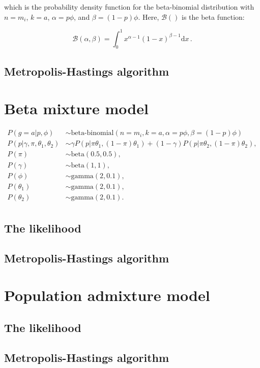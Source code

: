 \documentclass[11pt,english,letterpaper,oneside]{article}
\begin{document}
which is the probability density function for the beta-binomial distribution with $n = m_i$, $k = a$, $\alpha = p\phi$, and $\beta = (1 - p)\phi$. Here, $\mathcal{B}()$ is the beta function:

\begin{equation*}
\mathcal{B}(\alpha,\beta) = \int_0^1 x^{\alpha-1} (1 - x)^{\beta - 1} \text{d}x\, .
\end{equation*}

\subsection{Metropolis-Hastings algorithm}

\section{Beta mixture model}

\begin{align*}
P(g=a|p,\phi) &\sim \text{beta-binomial}(n=m_i, k = a, \alpha = p\phi, \beta = (1-p)\phi) \\
P(p|\gamma, \pi, \theta_1, \theta_2) &\sim \gamma P(p|\pi\theta_1, (1-\pi)\theta_1) + (1-\gamma)P(p|\pi\theta_2, (1-\pi)\theta_2), \\
P(\pi) &\sim \text{beta}(0.5, 0.5), \\
P(\gamma) &\sim \text{beta}(1,1), \\
P(\phi) &\sim \text{gamma}(2,0.1), \\
P(\theta_1) &\sim \text{gamma}(2,0.1), \\
P(\theta_2) &\sim \text{gamma}(2,0.1). \\
\end{align*}

\subsection{The likelihood}

\subsection{Metropolis-Hastings algorithm}

\section{Population admixture model}

\subsection{The likelihood}

\subsection{Metropolis-Hastings algorithm}
\end{document}

